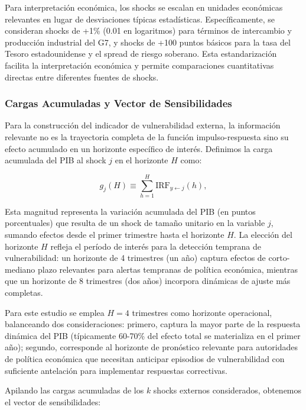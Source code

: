 \documentclass[3p,11pt,draft,natbib=false]{elsarticle}
\begin{document}
Para interpretación económica, los shocks se escalan en unidades económicas relevantes en lugar de desviaciones típicas estadísticas. Específicamente, se consideran shocks de +1\% (0.01 en logaritmos) para términos de intercambio y producción industrial del G7, y shocks de +100 puntos básicos para la tasa del Tesoro estadounidense y el spread de riesgo soberano. Esta estandarización facilita la interpretación económica y permite comparaciones cuantitativas directas entre diferentes fuentes de shocks.

\subsubsection{Cargas Acumuladas y Vector de Sensibilidades}

Para la construcción del indicador de vulnerabilidad externa, la información relevante no es la trayectoria completa de la función impulso-respuesta sino su efecto acumulado en un horizonte específico de interés. Definimos la carga acumulada del PIB al shock $j$ en el horizonte $H$ como:

\begin{equation}
g_j(H) \equiv \sum_{h=1}^{H} \text{IRF}_{y \leftarrow j}(h),
\label{eq:cumulative_loading}
\end{equation}

Esta magnitud representa la variación acumulada del PIB (en puntos porcentuales) que resulta de un shock de tamaño unitario en la variable $j$, sumando efectos desde el primer trimestre hasta el horizonte $H$. La elección del horizonte $H$ refleja el período de interés para la detección temprana de vulnerabilidad: un horizonte de 4 trimestres (un año) captura efectos de corto-mediano plazo relevantes para alertas tempranas de política económica, mientras que un horizonte de 8 trimestres (dos años) incorpora dinámicas de ajuste más completas.

Para este estudio se emplea $H=4$ trimestres como horizonte operacional, balanceando dos consideraciones: primero, captura la mayor parte de la respuesta dinámica del PIB (típicamente 60-70\% del efecto total se materializa en el primer año); segundo, corresponde al horizonte de pronóstico relevante para autoridades de política económica que necesitan anticipar episodios de vulnerabilidad con suficiente antelación para implementar respuestas correctivas.

Apilando las cargas acumuladas de los $k$ shocks externos considerados, obtenemos el vector de sensibilidades:
\end{document}
